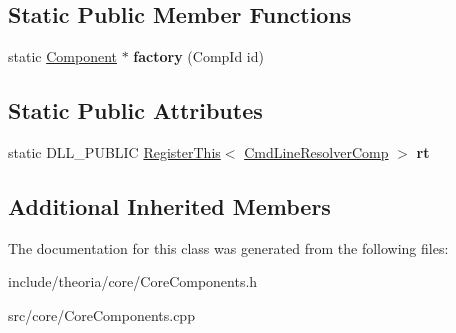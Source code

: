 \subsection*{Static Public Member Functions}
\begin{DoxyCompactItemize}
\item 
\mbox{\label{classtheoria_1_1core_1_1CmdLineResolverComp_a14fd80f330eb79fc13dcc25288c16bdf}} 
static \hyperlink{classtheoria_1_1core_1_1Component}{Component} $\ast$ {\bfseries factory} (Comp\+Id id)
\end{DoxyCompactItemize}
\subsection*{Static Public Attributes}
\begin{DoxyCompactItemize}
\item 
\mbox{\label{classtheoria_1_1core_1_1CmdLineResolverComp_abcfcffaadb0282780e36034efc28f3aa}} 
static D\+L\+L\+\_\+\+P\+U\+B\+L\+IC \hyperlink{classtheoria_1_1core_1_1RegisterThis}{Register\+This}$<$ \hyperlink{classtheoria_1_1core_1_1CmdLineResolverComp}{Cmd\+Line\+Resolver\+Comp} $>$ {\bfseries rt}
\end{DoxyCompactItemize}
\subsection*{Additional Inherited Members}


The documentation for this class was generated from the following files\+:\begin{DoxyCompactItemize}
\item 
include/theoria/core/Core\+Components.\+h\item 
src/core/Core\+Components.\+cpp\end{DoxyCompactItemize}
